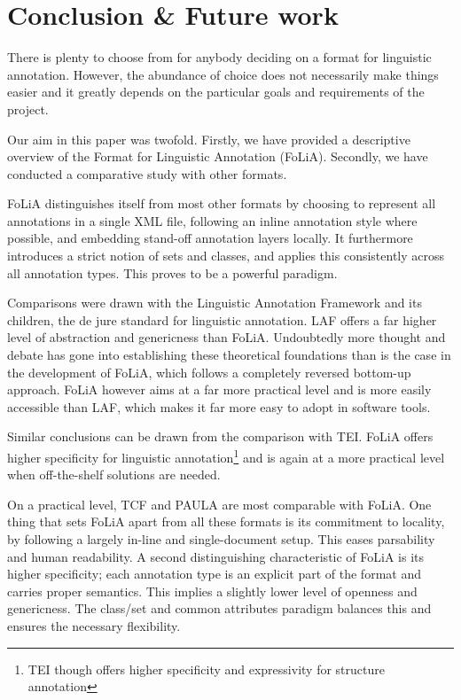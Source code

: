 \documentclass[a4paper,10pt,twoside]{article}
\begin{document}
\section{Conclusion \& Future work}

There is plenty to choose from for anybody deciding on a format for
linguistic annotation. However, the abundance of choice does not necessarily make
things easier and it greatly depends on the particular goals and requirements of the
project.  

Our aim in this paper was twofold. Firstly, we have provided a descriptive
overview of the Format for Linguistic Annotation (FoLiA). Secondly, we have
conducted a comparative study with other formats.

FoLiA distinguishes itself from most other formats by choosing to represent
all annotations in a single XML file, following an inline annotation style where
possible, and embedding stand-off annotation layers locally. It furthermore
introduces a strict notion of sets and classes, and applies this consistently
across all annotation types. This proves to be a powerful paradigm.

Comparisons were drawn with the Linguistic Annotation Framework and its
children, the de jure standard for linguistic annotation. LAF offers a far
higher level of abstraction and genericness than FoLiA. Undoubtedly more
thought and debate has gone into establishing these theoretical foundations
than is the case in the development of FoLiA, which follows a completely
reversed bottom-up approach. FoLiA however aims at a far more practical level and is
more easily accessible than LAF, which makes it far more easy to adopt in
software tools. 

Similar conclusions can be drawn from the comparison with TEI. FoLiA offers
higher specificity for linguistic annotation\footnote{TEI though offers higher
specificity and expressivity for structure annotation} and is again at a more
practical level when off-the-shelf solutions are needed.

On a practical level, TCF and PAULA are most comparable with FoLiA. One thing
that sets FoLiA apart from all these formats is its commitment to locality, by
following a largely in-line and single-document setup. This eases
parsability and human readability. A second distinguishing characteristic of
FoLiA is its higher specificity; each annotation type is an explicit part of
the format and carries proper semantics. This implies a slightly lower level of
openness and genericness. The class/set and common attributes paradigm balances
this and ensures the necessary flexibility.
\end{document}
